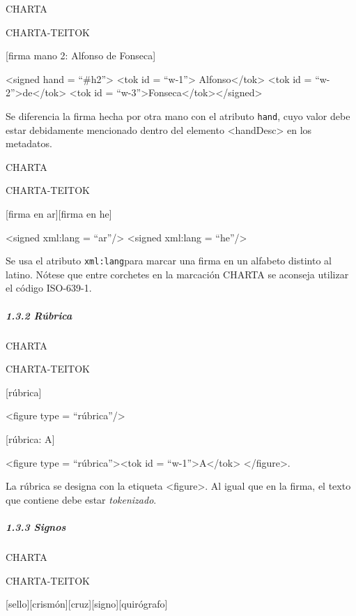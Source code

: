 \documentclass[
]{book}
\begin{document}
CHARTA

CHARTA-TEITOK

{[}firma mano 2: Alfonso de Fonseca{]}

{\textless signed} {hand} {=} {``\#h2''}{\textgreater{}}
{\textless tok} {id} {=} {``w-1''}{\textgreater{}} Alfonso{\textless/tok\textgreater{}} {\textless tok} {id} {=} {``w-2''}{\textgreater{}}de{\textless/tok\textgreater{}}
{\textless tok} {id} {=} {``w-3''}{\textgreater{}}Fonseca{\textless/tok\textgreater{}}{\textless/signed\textgreater{}}

Se diferencia la firma hecha por otra mano con el atributo \texttt{hand}, cuyo valor debe estar debidamente mencionado dentro del elemento { \textless handDesc\textgreater{}} en los metadatos.

CHARTA

CHARTA-TEITOK

{[}firma en ar{]}{[}firma en he{]}

{\textless signed} {xml:lang} {=} {``ar''}{/\textgreater{}}
{\textless signed} {xml:lang} {=} {``he''}{/\textgreater{}}

Se usa el atributo \texttt{xml:lang}para marcar una firma en un alfabeto distinto al latino. Nótese que entre corchetes en la marcación CHARTA se aconseja utilizar el código ISO-639-1.

\hypertarget{ruxfabrica}{%
\subparagraph*{1.3.2 Rúbrica}\label{ruxfabrica}}

CHARTA

CHARTA-TEITOK

{[}rúbrica{]}

{\textless figure} {type} {=} {``rúbrica''}{/\textgreater{}}

{[}rúbrica: A{]}

{\textless figure} {type} {=} {``rúbrica''}{\textgreater{}}{\textless tok} {id} {=} {``w-1''}{\textgreater{}}A{\textless/tok\textgreater{} }{\textless/figure\textgreater{}}.

La rúbrica se designa con la etiqueta { \textless figure\textgreater{}}. Al igual que en la firma, el texto que contiene debe estar \emph{tokenizado}.

\hypertarget{signos}{%
\subparagraph*{1.3.3 Signos}\label{signos}}

CHARTA

CHARTA-TEITOK

{[}sello{]}{[}crismón{]}{[}cruz{]}{[}signo{]}{[}quirógrafo{]}
\end{document}
